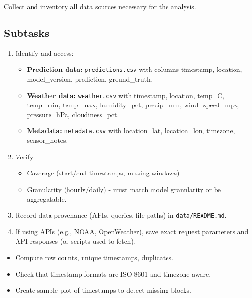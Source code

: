 \documentclass[11pt,a4paper]{article}
\begin{document}
\begin{objectivebox}
Collect and inventory all data sources necessary for the analysis.
\end{objectivebox}

\subsection{Subtasks}

\begin{enumerate}[label=\arabic*.]
    \item Identify and access:
    \begin{itemize}
        \item \textbf{Prediction data:} \texttt{predictions.csv} with columns timestamp, location, model\_version, prediction, ground\_truth.
        \item \textbf{Weather data:} \texttt{weather.csv} with timestamp, location, temp\_C, temp\_min, temp\_max, humidity\_pct, precip\_mm, wind\_speed\_mps, pressure\_hPa, cloudiness\_pct.
        \item \textbf{Metadata:} \texttt{metadata.csv} with location\_lat, location\_lon, timezone, sensor\_notes.
    \end{itemize}
    
    \item Verify:
    \begin{itemize}
        \item Coverage (start/end timestamps, missing windows).
        \item Granularity (hourly/daily) - must match model granularity or be aggregatable.
    \end{itemize}
    
    \item Record data provenance (APIs, queries, file paths) in \texttt{data/README.md}.
    
    \item If using APIs (e.g., NOAA, OpenWeather), save exact request parameters and API responses (or scripts used to fetch).
\end{enumerate}

\begin{checkbox}
\begin{itemize}
    \item Compute row counts, unique timestamps, duplicates.
    \item Check that timestamp formats are ISO 8601 and timezone-aware.
    \item Create sample plot of timestamps to detect missing blocks.
\end{itemize}
\end{checkbox}
\end{document}
